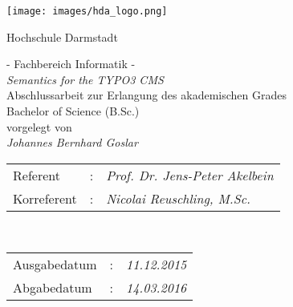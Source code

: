 
\begin{titlepage}
  \thispagestyle{empty}
\null \newpage
\end{titlepage}

\begin{titlepage}
\begin{center}
\texttt{[image: images/hda\_logo.png]}

\vspace{1.0cm}
{\LARGE Hochschule Darmstadt}\\

{\Large - Fachbereich Informatik - \\

\vspace{2.0cm}
{\it Semantics for the TYPO3 CMS}\\

\vspace{1.0cm}
Abschlussarbeit zur Erlangung des akademischen Grades\\
Bachelor of Science (B.Sc.)\\

\vspace{1.0cm}
vorgelegt von\\
{\it Johannes Bernhard Goslar}

\vspace{1.0cm}
\begin{tabular}{lll}
Referent &:& {\it Prof. Dr. Jens-Peter Akelbein}\\
Korreferent &:& {\it Nicolai Reuschling, M.Sc.}\\
\end{tabular}
\\\vspace{1.0cm}

\begin{tabular}{lll}
Ausgabedatum&:& {\it 11.12.2015}\\
Abgabedatum&:& {\it 14.03.2016}\\
\end{tabular}
}

\end{center}
\end{titlepage}
\newpage